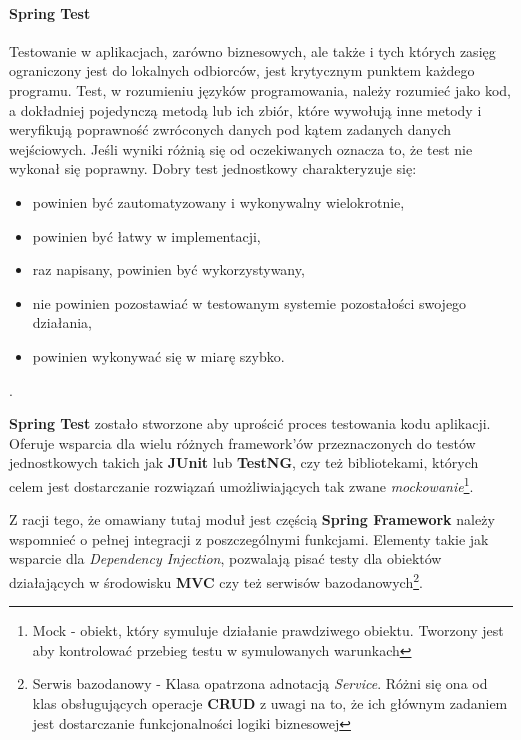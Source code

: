 	\paragraph{Spring Test}
	Testowanie w aplikacjach, zarówno biznesowych, ale także i tych których zasięg ograniczony jest do lokalnych odbiorców, jest
	krytycznym punktem każdego programu. Test, w rozumieniu języków programowania, należy rozumieć jako kod, a dokładniej pojedynczą
	metodą lub ich zbiór, które wywołują inne metody i weryfikują poprawność zwróconych danych pod kątem zadanych danych wejściowych.
	Jeśli wyniki różnią się od oczekiwanych oznacza to, że test nie wykonał się poprawny.
	Dobry test jednostkowy charakteryzuje się:
	\begin{itemize}
		\item powinien być zautomatyzowany i wykonywalny wielokrotnie,
		\item powinien być łatwy w implementacji,
		\item raz napisany, powinien być wykorzystywany,
		\item nie powinien pozostawiać w testowanym systemie pozostałości swojego działania,
		\item powinien wykonywać się w miarę szybko.
	\end{itemize} \cite{the_art_of_unit_testing}.
	
	\textbf{Spring Test} zostało stworzone aby uprościć proces testowania kodu aplikacji. Oferuje wsparcia dla wielu różnych
	framework'ów przeznaczonych do testów jednostkowych takich jak \textbf{JUnit} lub \textbf{TestNG}, czy też bibliotekami, których
	celem jest dostarczanie rozwiązań umożliwiających tak zwane \textit{mockowanie}\footnote{Mock - obiekt, który symuluje działanie
	prawdziwego obiektu. Tworzony jest aby kontrolować przebieg testu w symulowanych warunkach}. 
	
	Z racji tego, że omawiany tutaj moduł jest częścią \textbf{Spring Framework} należy wspomnieć o pełnej integracji z poszczególnymi
	funkcjami. Elementy takie jak wsparcie dla \textit{Dependency Injection}, pozwalają pisać testy dla obiektów działających w
	środowisku \textbf{MVC} czy też serwisów bazodanowych\footnote{Serwis bazodanowy - Klasa opatrzona adnotacją \textit{\@{}Service}.
	Różni się ona od klas obsługujących operacje \textbf{CRUD} z uwagi na to, że ich głównym zadaniem jest dostarczanie funkcjonalności
	logiki biznesowej}. 
	
	
